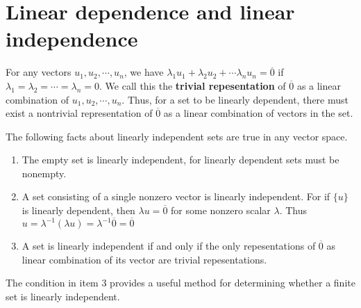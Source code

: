 \section{Linear dependence and linear independence}


For any vectors $u_1, u_2, \cdots, u_n$, we have $\lambda_1 u_1 + \lambda_2 u_2 + \cdots \lambda_n u_n = \overline0$ if $\lambda_1 = \lambda_2 = \cdots = \lambda_n = 0$. We call this the \textbf{trivial repesentation} of $\overline0$ as a linear combination of $u_1, u_2, \cdots, u_n$. Thus, for a set to be linearly dependent, there must exist a nontrivial representation of $\overline0$ as a linear combination of vectors in the set.



The following facts about linearly independent sets are true in any vector space.
\begin{enumerate}
  \item The empty set is linearly independent, for linearly dependent sets must be nonempty.
  \item A set consisting of a single nonzero vector is linearly independent. For if $\{u\}$ is linearly dependent, then $\lambda u = \overline 0$ for some nonzero scalar $\lambda$. Thus $u = \lambda ^{-1}(\lambda u) = \lambda^{-1}\overline0 = \overline0$
  \item A set is linearly independent if and only if the only repesentations of $\overline0$ as linear combination of its vector are trivial repesentations.
\end{enumerate}

\noindent The condition in item 3 provides a useful method for determining whether a finite set is linearly independent.

